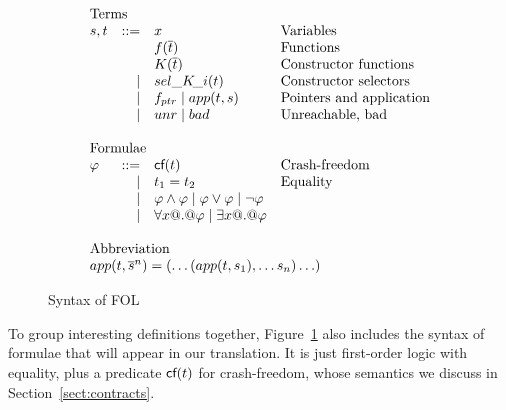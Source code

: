 \begin{figure}
\[\begin{array}{c} 
\begin{array}{lrll}
\multicolumn{3}{l}{\text{Terms}} \\
  s,t & ::=  & x                          & \text{Variables} \\ 
      &      & f(\ol{t})                  & \text{Functions} \\
      &      & K(\ol{t})                  & \text{Constructor functions} \\ 
      & \mid & \sel{K}{i}(t)              & \text{Constructor selectors} \\ 
      & \mid & f_{ptr} \mid app(t,s)       & \text{Pointers and application} \\
      & \mid & \unr \mid \bad             & \text{Unreachable, bad} \\ \\
\multicolumn{3}{l}{\text{Formulae}} \\ 
 \phi & ::=  & \lcf{t}    & \text{Crash-freedom} \\
      & \mid & t_1 = t_2  & \text{Equality} \\ 
      & \mid & \phi \land \phi \mid \phi \lor \phi \mid \neg \phi \\
      & \mid & \forall x @.@ \phi \mid \exists x @.@ \phi \\ \\ 
\multicolumn{3}{l}{\text{Abbreviation}} \\ 
\multicolumn{4}{l}{app(t,\oln{s}{n}) = (\ldots(app(t,s_1),\ldots s_n)\ldots)}
\end{array}
\end{array}\]
\caption{Syntax of FOL}\label{fig:fol-image}
\end{figure}

To group interesting definitions together, Figure~\ref{fig:fol-image}
also includes the syntax of formulae that will appear in our translation.
It is just first-order logic with equality, plus a predicate $\textsf{cf}(t)$ for 
crash-freedom, whose semantics we discuss in Section~\ref{sect:contracts}.


